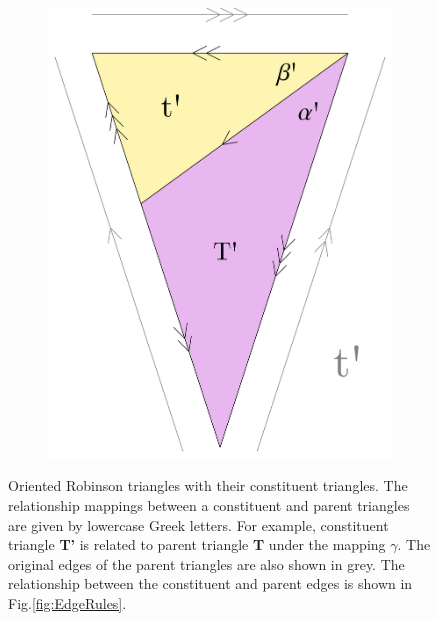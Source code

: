 \documentclass[
  oneside,
  11pt, a4paper,
  footinclude=true,
  headinclude=true,
  cleardoublepage=empty
]{scrbook}
\begin{document}
\begin{figure}[H]
        \begin{subfigure}[t]{0.55\textwidth}
        \end{subfigure}\hfill
        \begin{subfigure}[t]{0.35\textwidth}
                \includegraphics[width=\textwidth]{TS'}
        \end{subfigure}   
        \caption[Robinson Triangle Composition]{Oriented Robinson triangles with their constituent triangles. The relationship mappings between a constituent and parent triangles are given by lowercase Greek letters. For example, constituent triangle \textbf{T'} is related to parent triangle \textbf{T} under the mapping $\gamma$. The original edges of the parent triangles are also shown in grey. The relationship between the constituent and parent edges is shown in Fig.\ref{fig:EdgeRules}.}
        \label{fig:OrientedSub}                     
\end{figure}
\end{document}
